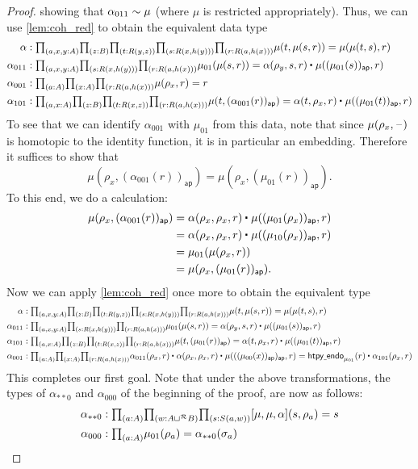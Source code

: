 \begin{proof}
showing that $\alpha_{011}\sim \mu$ (where $\mu$ is restricted appropriately). Thus, we can use \autoref{lem:coh_red} to obtain the equivalent data type
\begin{align*}
\alpha & : \prd{a,x,y:A}{z:B}{t:R(y,z)}{s:R(x,h(y))}{r:R(a,h(x))} \mu(t,\mu(s,r)) = \mu(\mu(t,s),r) \\
\alpha_{011} & : \prd{a,x,y:A}{s:R(x,h(y))}{r:R(a,h(x))} \mu_{01}(\mu(s,r))=\ct{\alpha(\rho_y,s,r)}{\mu((\mu_{01}(s))_{\mathsf{ap}},r)} \\
\alpha_{001} & : \prd{a:A}{x:A}{r:R(a,h(x))} \mu(\rho_x,r)=r \\
\alpha_{101} & : \prd{a,x:A}{z:B}{t:R(x,z)}{r:R(a,h(x))} \mu(t,(\alpha_{001}(r))_{\mathsf{ap}})=\ct{\alpha(t,\rho_x,r)}{\mu((\mu_{01}(t))_{\mathsf{ap}},r)}
\end{align*}
To see that we can identify $\alpha_{001}$ with $\mu_{01}$ from this data, note that since $\mu(\rho_x,\mathord{\hspace{1pt}\text{--}\hspace{1pt}})$ is homotopic to the identity function, it is in particular an embedding. Therefore it suffices to show that
\begin{equation*}
\mu(\rho_x,(\alpha_{001}(r))_{\mathsf{ap}})= \mu(\rho_x,(\mu_{01}(r))_{\mathsf{ap}}).
\end{equation*}
To this end, we do a calculation:
\begin{align*}
\mu(\rho_x,(\alpha_{001}(r))_{\mathsf{ap}})
& = \ct{\alpha(\rho_x,\rho_x,r)}{\mu((\mu_{01}(\rho_x))_{\mathsf{ap}},r)} \\
& = \ct{\alpha(\rho_x,\rho_x,r)}{\mu((\mu_{10}(\rho_x))_{\mathsf{ap}},r)} \\
& = \mu_{01}(\mu(\rho_x,r)) \\
& = \mu(\rho_x,(\mu_{01}(r))_{\mathsf{ap}}).
\end{align*}
Now we can apply \autoref{lem:coh_red} once more to obtain the equivalent type
\begin{align*}
\alpha & : \prd{a,x,y:A}{z:B}{t:R(y,z)}{s:R(x,h(y))}{r:R(a,h(x))} \mu(t,\mu(s,r)) = \mu(\mu(t,s),r) \\
\alpha_{011} & : \prd{a,x,y:A}{s:R(x,h(y))}{r:R(a,h(x))} \mu_{01}(\mu(s,r))=\ct{\alpha(\rho_y,s,r)}{\mu((\mu_{01}(s))_{\mathsf{ap}},r)} \\
\alpha_{101} & : \prd{a,x:A}{z:B}{t:R(x,z)}{r:R(a,h(x))} \mu(t,(\mu_{01}(r))_{\mathsf{ap}})=\ct{\alpha(t,\rho_x,r)}{\mu((\mu_{01}(t))_{\mathsf{ap}},r)} \\
\alpha_{001} & : \prd{a:A}{x:A}{r:R(a,h(x))} \ct{\alpha_{011}(\rho_x,r)}{\ct{\alpha(\rho_x,\rho_x,r)}{\mu(((\mu_{00}(x))_{\mathsf{ap}})_{\mathsf{ap}},r)}}=\ct{\mathsf{htpy\underline{~}endo}_{\mu_{01}}(r)}{\alpha_{101}(\rho_x,r)}
\end{align*}
This completes our first goal. Note that under the above transformations, the types of $\alpha_{\ast\ast 0}$ and $\alpha_{000}$ of the beginning of the proof, are now as follows:
\begin{align*}
\alpha_{\ast\ast 0} & : \prd{a:A}{w:A\sqcup^{\mathcal{R}} B}{s:S(a,w)} [\mu,\mu,\alpha](s,\rho_a)=s \\
\alpha_{000} & : \prd{a:A} \mu_{01}(\rho_a)=\alpha_{\ast\ast 0}(\sigma_a)
\end{align*}
\end{proof}


